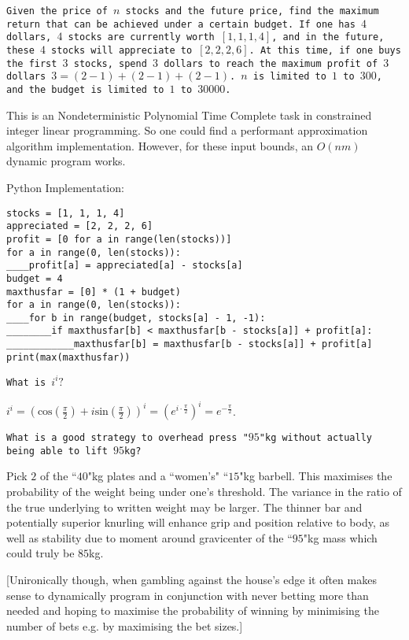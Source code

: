 \texttt{Given the price of $n$ stocks and the future price, find the maximum return that can be achieved under a certain budget. If one has $4$ dollars, $4$ stocks are currently worth $[1,1,1,4]$, and in the future, these $4$ stocks will appreciate to $[2,2,2,6]$. At this time, if one buys the first $3$ stocks, spend $3$ dollars to reach the maximum profit of $3$ dollars $3=(2-1)+(2-1)+(2-1)$. $n$ is limited to $1$ to $300$, and the budget is limited to $1$ to $30000$.}

This is an Nondeterministic Polynomial Time Complete task in constrained integer linear programming. So one could find a performant approximation algorithm implementation. However, for these input bounds, an $O(nm)$ dynamic program works.

Python Implementation:

\begin{verbatim}
stocks = [1, 1, 1, 4]
appreciated = [2, 2, 2, 6]
profit = [0 for a in range(len(stocks))]
for a in range(0, len(stocks)):
____profit[a] = appreciated[a] - stocks[a]
budget = 4
maxthusfar = [0] * (1 + budget)
for a in range(0, len(stocks)):
____for b in range(budget, stocks[a] - 1, -1):
________if maxthusfar[b] < maxthusfar[b - stocks[a]] + profit[a]:
____________maxthusfar[b] = maxthusfar[b - stocks[a]] + profit[a]
print(max(maxthusfar))
\end{verbatim}

\texttt{What is $i^i?$}

$i^i = \left ( \text{cos}\left( \frac{\pi}{2} \right)+i \text{sin}\left( \frac{\pi}{2} \right) \right )^i = \left ( e^{i \cdot \frac{\pi}{2}} \right )^i = \boxed{e^{-\frac{\pi}{2}}}$.

\texttt{What is a good strategy to overhead press "$95$"kg without actually being able to lift $95$kg?}

Pick $2$ of the ``$40$"kg plates and a ``women's" ``$15$"kg barbell. This maximises the probability of the weight being under one's threshold. The variance in the ratio of the true underlying to written weight may be larger. The thinner bar and potentially superior knurling will enhance grip and position relative to body, as well as stability due to moment around gravicenter of the ``$95$"kg mass which could truly be $85$kg.

[Unironically though, when gambling against the house's edge it often makes sense to dynamically program in conjunction with never betting more than needed and hoping to maximise the probability of winning by minimising the number of bets e.g. by maximising the bet sizes.]

